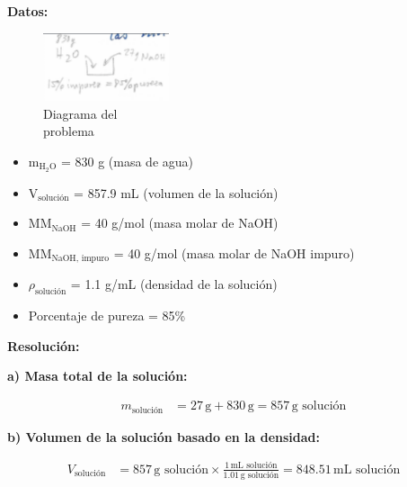 \documentclass{article}
\begin{document}
\begin{multicols}{2} %

\noindent\textbf{Datos:} %

\begin{figure}[H]
    \begin{minipage}[t]{0.3\textwidth} %
        \raggedright %
        \includegraphics[width=\linewidth, height=2cm]{./problema4_diagrama.png} %
        \caption{Diagrama del \\ problema}
    \end{minipage}
\end{figure}

\begin{itemize}
\item m$_{\text{H}_2\text{O}}$ = 830 g (masa de agua)
\item V$_{\text{solución}}$ = 857.9 mL (volumen de la solución)
\item MM$_{\text{NaOH}}$ = 40 g/mol (masa molar de NaOH)
\item MM$_{\text{NaOH, impuro}}$ = 40 g/mol (masa molar de NaOH impuro)
\item $\rho_{\text{solución}}$ = 1.1 g/mL (densidad de la solución)
\item Porcentaje de pureza = 85\%
\end{itemize}

\columnbreak %

\noindent\textbf{Resolución:} %

\textbf{a) Masa total de la solución:}

\begin{align*}
    m_{\text{solución}} &= 27 \, \text{g} + 830 \, \text{g} = 857 \, \text{g solución}
\end{align*}

\textbf{b) Volumen de la solución basado en la densidad:}

\begin{align*}
    V_{\text{solución}} &= 857 \, \text{g solución} \times \frac{1 \, \text{mL solución}}{1.01 \, \text{g solución}} = 848.51 \, \text{mL solución}
\end{align*}


\end{multicols}
\end{document}
